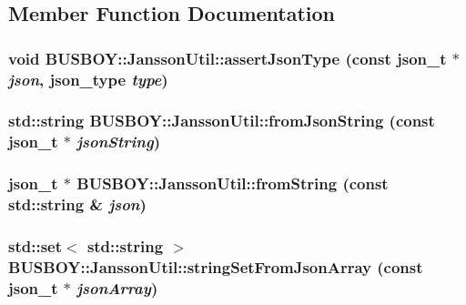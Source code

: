 \subsection{Member Function Documentation}
\hypertarget{classBUSBOY_1_1JanssonUtil_a9bcfb0e2a1a5a2a8fc49e9ec31e0f27f}{
\subsubsection[{assertJsonType}]{\setlength{\rightskip}{0pt plus 5cm}void BUSBOY::JanssonUtil::assertJsonType (const json\_\-t $\ast$ {\em json}, \/  json\_\-type {\em type})}}
\label{classBUSBOY_1_1JanssonUtil_a9bcfb0e2a1a5a2a8fc49e9ec31e0f27f}
\hypertarget{classBUSBOY_1_1JanssonUtil_ac61371356aed094549ebb26d3a30bb26}{
\subsubsection[{fromJsonString}]{\setlength{\rightskip}{0pt plus 5cm}std::string BUSBOY::JanssonUtil::fromJsonString (const json\_\-t $\ast$ {\em jsonString})}}
\label{classBUSBOY_1_1JanssonUtil_ac61371356aed094549ebb26d3a30bb26}
\hypertarget{classBUSBOY_1_1JanssonUtil_ae61a00d95d55c40407b81ea7ecb9a2ff}{
\subsubsection[{fromString}]{\setlength{\rightskip}{0pt plus 5cm}json\_\-t $\ast$ BUSBOY::JanssonUtil::fromString (const std::string \& {\em json})}}
\label{classBUSBOY_1_1JanssonUtil_ae61a00d95d55c40407b81ea7ecb9a2ff}
\hypertarget{classBUSBOY_1_1JanssonUtil_aa5d1804e4c6802073d447aebece437a0}{
\subsubsection[{stringSetFromJsonArray}]{\setlength{\rightskip}{0pt plus 5cm}std::set$<$ std::string $>$ BUSBOY::JanssonUtil::stringSetFromJsonArray (const json\_\-t $\ast$ {\em jsonArray})}}
